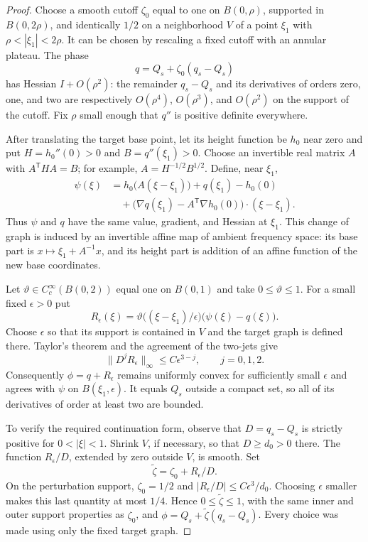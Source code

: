 \begin{proof}
Choose a smooth cutoff $\zeta_0$ equal to one on $B(0,\rho)$,
supported in $B(0,2\rho)$, and identically $1/2$ on a neighborhood
$V$ of a point $\xi_1$ with $\rho<|\xi_1|<2\rho$.
It can be chosen by rescaling a fixed cutoff with an annular plateau.
The phase
\[
 q=Q_s+\zeta_0(q_s-Q_s)
\]
has Hessian $I+O(\rho^2)$: the remainder $q_s-Q_s$ and its
derivatives of orders zero, one, and two are respectively
$O(\rho^4)$, $O(\rho^3)$, and $O(\rho^2)$ on the support of the
cutoff.  Fix $\rho$ small enough that $q''$ is positive definite
everywhere.

After translating the target base point, let its height function be
$h_0$ near zero and put $H=h_0''(0)>0$ and $B=q''(\xi_1)>0$.
Choose an invertible real matrix $A$ with $A^{\mathsf T}HA=B$;
for example, $A=H^{-1/2}B^{1/2}$.  Define, near $\xi_1$,
\begin{align*}
 \psi(\xi)
 &=h_0\bigl(A(\xi-\xi_1)\bigr)+q(\xi_1)-h_0(0)\\
 &\quad+
 \bigl(\nabla q(\xi_1)-A^{\mathsf T}\nabla h_0(0)\bigr)
                \cdot(\xi-\xi_1).
\end{align*}
Thus $\psi$ and $q$ have the same value, gradient, and Hessian at
$\xi_1$.  This change of graph is induced by an invertible affine
map of ambient frequency space: its base part is
$x\mapsto \xi_1+A^{-1}x$, and its height part is addition of an
affine function of the new base coordinates.

Let $\vartheta\in C_c^\infty(B(0,2))$ equal one on $B(0,1)$ and
take $0\le\vartheta\le1$.  For a small fixed $\epsilon>0$ put
\[
 R_\epsilon(\xi)=
 \vartheta\bigl((\xi-\xi_1)/\epsilon\bigr)
                  \bigl(\psi(\xi)-q(\xi)\bigr).
\]
Choose $\epsilon$ so that its support is contained in $V$ and the
target graph is defined there.  Taylor's theorem and the agreement
of the two-jets give
\[
 \|D^jR_\epsilon\|_\infty\le C\epsilon^{3-j},
 \qquad j=0,1,2.
\]
Consequently $\phi=q+R_\epsilon$ remains uniformly convex for
sufficiently small $\epsilon$ and agrees with $\psi$ on
$B(\xi_1,\epsilon)$.  It equals $Q_s$ outside a compact set, so
all of its derivatives of order at least two are bounded.

To verify the required continuation form, observe that
$D=q_s-Q_s$ is strictly positive for $0<|\xi|<1$.
Shrink $V$, if necessary, so that $D\ge d_0>0$ there.  The function
$R_\epsilon/D$, extended by zero outside $V$, is smooth.  Set
\[
 \widetilde\zeta=\zeta_0+R_\epsilon/D.
\]
On the perturbation support, $\zeta_0=1/2$ and
$|R_\epsilon/D|\le C\epsilon^3/d_0$.  Choosing $\epsilon$
smaller makes this last quantity at most $1/4$.  Hence
$0\le\widetilde\zeta\le1$, with the same inner and outer support
properties as $\zeta_0$, and
$\phi=Q_s+\widetilde\zeta(q_s-Q_s)$.
Every choice was made using only the fixed target graph.
\end{proof}

